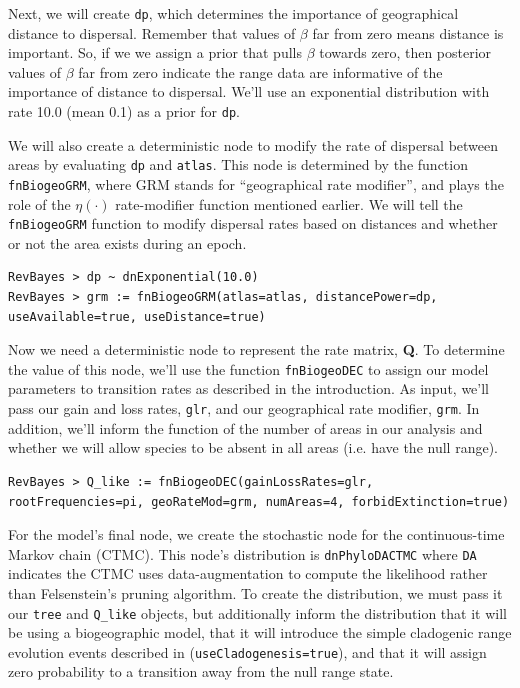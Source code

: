 \documentclass[11pt]{article}
\begin{document}
Next, we will create {\tt dp}, which determines the importance of geographical distance to dispersal.
Remember that values of $\beta$ far from zero means distance is important.
So, if we we assign a prior that pulls $\beta$ towards zero, then posterior values of $\beta$ far from zero indicate the range data are informative of the importance of distance to dispersal.
We'll use an exponential distribution with rate 10.0 (mean 0.1) as a prior for {\tt dp}.

We will also create a deterministic node to modify the rate of dispersal between areas by evaluating {\tt dp} and {\tt atlas}.
This node is determined by the function {\tt fnBiogeoGRM}, where GRM stands for ``geographical rate modifier'', and plays the role of the $\eta(\cdot)$ rate-modifier function mentioned earlier.
We will tell the {\tt fnBiogeoGRM} function to modify dispersal rates based on distances and whether or not the area exists during an epoch.

\begin{snugshade}
\begin{lstlisting}
RevBayes > dp ~ dnExponential(10.0)
RevBayes > grm := fnBiogeoGRM(atlas=atlas, distancePower=dp, useAvailable=true, useDistance=true)
\end{lstlisting}
\end{snugshade}

Now we need a deterministic node to represent the rate matrix, {\bf Q}.
To determine the value of this node, we'll use the function {\tt fnBiogeoDEC} to assign our model parameters to transition rates as described in the introduction.
As input, we'll pass our gain and loss rates, {\tt glr}, and our geographical rate modifier, {\tt grm}.
In addition, we'll inform the function of the number of areas in our analysis and whether we will allow species to be absent in all areas (i.e. have the null range).

\begin{snugshade}
\begin{lstlisting}
RevBayes > Q_like := fnBiogeoDEC(gainLossRates=glr, rootFrequencies=pi, geoRateMod=grm, numAreas=4, forbidExtinction=true)
\end{lstlisting}
\end{snugshade}

For the model's final node, we create the stochastic node for the continuous-time Markov chain (CTMC).
This node's distribution is {\tt dnPhyloDACTMC} where {\tt DA} indicates the CTMC uses data-augmentation to compute the likelihood rather than Felsenstein's pruning algorithm.
To create the distribution, we must pass it our {\tt tree} and {\tt Q\_like} objects, but additionally inform the distribution that it will be using a biogeographic model, that it will introduce the simple cladogenic range evolution events described in \citet{ree08} ({\tt useCladogenesis=true}), and that it will assign zero probability to a transition away from the null range state.
\end{document}
